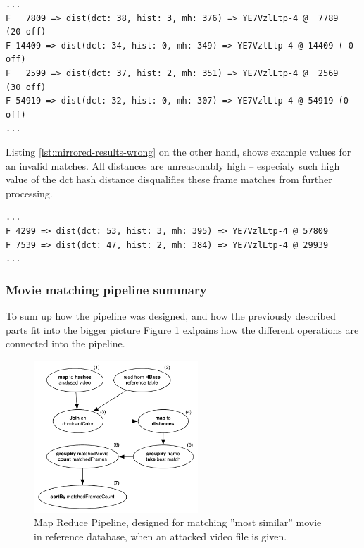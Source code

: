 \begin{lstlisting}[caption={Examples of valid ''best'' matches for a few sample frames (mirrored movie).}, label={lst:mirrored-results}]
...
F   7809 => dist(dct: 38, hist: 3, mh: 376) => YE7VzlLtp-4 @  7789   (20 off)
F 14409 => dist(dct: 34, hist: 0, mh: 349) => YE7VzlLtp-4 @ 14409 ( 0 off)
F   2599 => dist(dct: 37, hist: 2, mh: 351) => YE7VzlLtp-4 @  2569   (30 off)
F 54919 => dist(dct: 32, hist: 0, mh: 307) => YE7VzlLtp-4 @ 54919 (0 off)
...
\end{lstlisting}

Listing \ref{lst:mirrored-results-wrong} on the other hand, shows example values for an invalid matches. All distances are unreasonably high -- especialy such high value of the dct hash distance disqualifies these frame matches from further processing.

\begin{lstlisting}[caption={Examples of invalid matches for a few sample frames.}, label={lst:mirrored-results-wrong}]
...
F 4299 => dist(dct: 53, hist: 3, mh: 395) => YE7VzlLtp-4 @ 57809
F 7539 => dist(dct: 47, hist: 2, mh: 384) => YE7VzlLtp-4 @ 29939
...
\end{lstlisting}


\subsubsection{Movie matching pipeline summary}
To sum up how the pipeline was designed, and how the previously described parts fit into the bigger picture Figure \ref{fig:full-job} exlpains how the different operations are connected into the pipeline.

\begin{figure}[ch!]
  \centering
  \includegraphics[width=0.55\textwidth]{img/top-match-job}
  \caption{Map Reduce Pipeline, designed for matching ''most similar'' movie in reference database, when an attacked video file is given.}
  \label{fig:full-job}
\end{figure}

